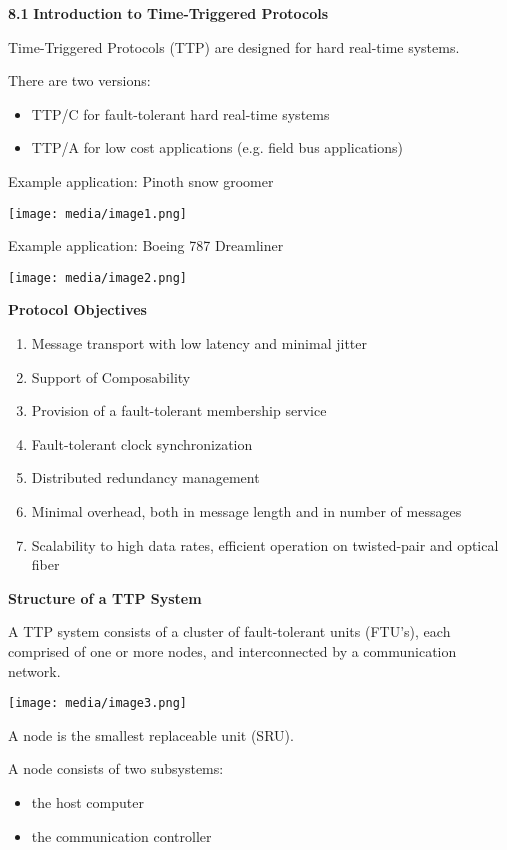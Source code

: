 \textbf{8.1} \protect\hypertarget{teil2}{}{}\textbf{Introduction to
Time-Triggered Protocols}

Time-Triggered Protocols (TTP) are designed for hard real-time systems.

There are two versions:

\begin{itemize}
\item
  TTP/C for fault-tolerant hard real-time systems
\item
  TTP/A for low cost applications (e.g. field bus applications)
\end{itemize}

Example application: Pinoth snow groomer

\texttt{[image: media/image1.png]}

Example application: Boeing 787 Dreamliner

\texttt{[image: media/image2.png]}

\textbf{Protocol Objectives}

\begin{enumerate}
\def\labelenumi{\arabic{enumi}.}
\item
  Message transport with low latency and minimal jitter
\item
  Support of Composability
\item
  Provision of a fault-tolerant membership service
\item
  Fault-tolerant clock synchronization
\item
  Distributed redundancy management
\item
  Minimal overhead, both in message length and in number of messages
\item
  Scalability to high data rates, efficient operation on twisted-pair
  and optical fiber
\end{enumerate}

\textbf{Structure of a TTP System}

A TTP system consists of a cluster of fault-tolerant units (FTU's), each
comprised of one or more nodes, and interconnected by a communication
network.

\texttt{[image: media/image3.png]}

A node is the smallest replaceable unit (SRU).

A node consists of two subsystems:

\begin{itemize}
\item
  the host computer
\item
  the communication controller
\end{itemize}

